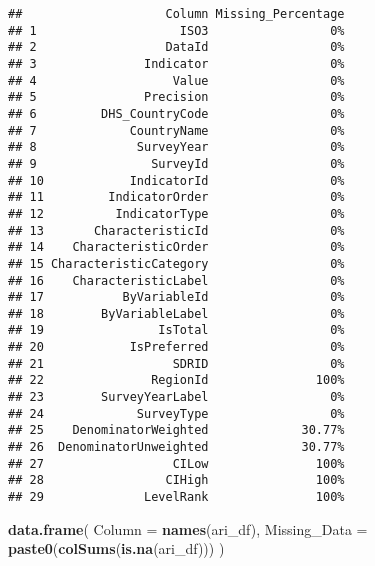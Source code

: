 \documentclass[
]{article}
\newenvironment{Shaded}{\begin{snugshade}}{\end{snugshade}}
\newcommand{\AttributeTok}[1]{\textcolor[rgb]{0.13,0.29,0.53}{#1}}
\newcommand{\FunctionTok}[1]{\textcolor[rgb]{0.13,0.29,0.53}{\textbf{#1}}}
\newcommand{\NormalTok}[1]{#1}
\begin{document}
\begin{verbatim}
##                    Column Missing_Percentage
## 1                    ISO3                 0%
## 2                  DataId                 0%
## 3               Indicator                 0%
## 4                   Value                 0%
## 5               Precision                 0%
## 6         DHS_CountryCode                 0%
## 7             CountryName                 0%
## 8              SurveyYear                 0%
## 9                SurveyId                 0%
## 10            IndicatorId                 0%
## 11         IndicatorOrder                 0%
## 12          IndicatorType                 0%
## 13       CharacteristicId                 0%
## 14    CharacteristicOrder                 0%
## 15 CharacteristicCategory                 0%
## 16    CharacteristicLabel                 0%
## 17           ByVariableId                 0%
## 18        ByVariableLabel                 0%
## 19                IsTotal                 0%
## 20            IsPreferred                 0%
## 21                  SDRID                 0%
## 22               RegionId               100%
## 23        SurveyYearLabel                 0%
## 24             SurveyType                 0%
## 25    DenominatorWeighted             30.77%
## 26  DenominatorUnweighted             30.77%
## 27                  CILow               100%
## 28                 CIHigh               100%
## 29              LevelRank               100%
\end{verbatim}

\begin{Shaded}
\begin{Highlighting}[]
\FunctionTok{data.frame}\NormalTok{(}
  \AttributeTok{Column =} \FunctionTok{names}\NormalTok{(ari\_df),}
  \AttributeTok{Missing\_Data =} \FunctionTok{paste0}\NormalTok{(}\FunctionTok{colSums}\NormalTok{(}\FunctionTok{is.na}\NormalTok{(ari\_df)))}
\NormalTok{  )}
\end{Highlighting}
\end{Shaded}
\end{document}

